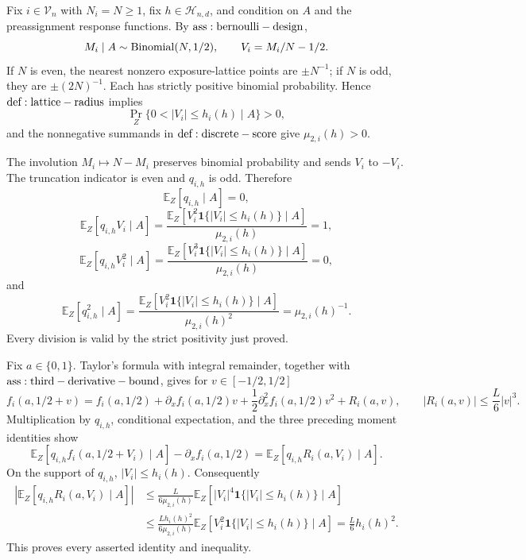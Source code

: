 Fix \(i\in\mathcal V_n\) with \(N_i=N\geq1\), fix \(h\in\mathcal H_{n,d}\), and condition on \(A\) and the preassignment response functions.  By \({\rm ass:bernoulli-design}\),
\[
 M_i\mid A\sim {\rm Binomial}(N,1/2),\qquad V_i=M_i/N-1/2.
\]
If \(N\) is even, the nearest nonzero exposure-lattice points are \(\pm N^{-1}\); if \(N\) is odd, they are \(\pm(2N)^{-1}\).  Each has strictly positive binomial probability.  Hence \({\rm def:lattice-radius}\) implies
\[
 \Pr_Z\{0<|V_i|\leq h_i(h)\mid A\}>0,
\]
and the nonnegative summands in \({\rm def:discrete-score}\) give \(\mu_{2,i}(h)>0\).

The involution \(M_i\mapsto N-M_i\) preserves binomial probability and sends \(V_i\) to \(-V_i\).  The truncation indicator is even and \(q_{i,h}\) is odd.  Therefore
\[
 \mathbb E_Z[q_{i,h}\mid A]=0,
\]
\[
 \mathbb E_Z[q_{i,h}V_i\mid A]
 =\frac{\mathbb E_Z[V_i^2\mathbf1\{|V_i|\leq h_i(h)\}\mid A]}{\mu_{2,i}(h)}=1,
\]
\[
 \mathbb E_Z[q_{i,h}V_i^2\mid A]
 =\frac{\mathbb E_Z[V_i^3\mathbf1\{|V_i|\leq h_i(h)\}\mid A]}{\mu_{2,i}(h)}=0,
\]
and
\[
 \mathbb E_Z[q_{i,h}^2\mid A]
 =\frac{\mathbb E_Z[V_i^2\mathbf1\{|V_i|\leq h_i(h)\}\mid A]}{\mu_{2,i}(h)^2}
 =\mu_{2,i}(h)^{-1}.
\]
Every division is valid by the strict positivity just proved.

Fix \(a\in\{0,1\}\).  Taylor's formula with integral remainder, together with \({\rm ass:third-derivative-bound}\), gives for \(v\in[-1/2,1/2]\)
\[
 f_i(a,1/2+v)=f_i(a,1/2)+\partial_xf_i(a,1/2)v
 +\frac12\partial_x^2f_i(a,1/2)v^2+R_i(a,v),
 \qquad |R_i(a,v)|\leq \frac L6|v|^3.
\]
Multiplication by \(q_{i,h}\), conditional expectation, and the three preceding moment identities show
\[
 \mathbb E_Z[q_{i,h}f_i(a,1/2+V_i)\mid A]-\partial_xf_i(a,1/2)
 =\mathbb E_Z[q_{i,h}R_i(a,V_i)\mid A].
\]
On the support of \(q_{i,h}\), \(|V_i|\leq h_i(h)\).  Consequently
\[
\begin{aligned}
 \left|\mathbb E_Z[q_{i,h}R_i(a,V_i)\mid A]\right|
 &\leq \frac{L}{6\mu_{2,i}(h)}
 \mathbb E_Z[|V_i|^4\mathbf1\{|V_i|\leq h_i(h)\}\mid A]\\
 &\leq \frac{Lh_i(h)^2}{6\mu_{2,i}(h)}
 \mathbb E_Z[V_i^2\mathbf1\{|V_i|\leq h_i(h)\}\mid A]
 =\frac L6h_i(h)^2.
\end{aligned}
\]
This proves every asserted identity and inequality.